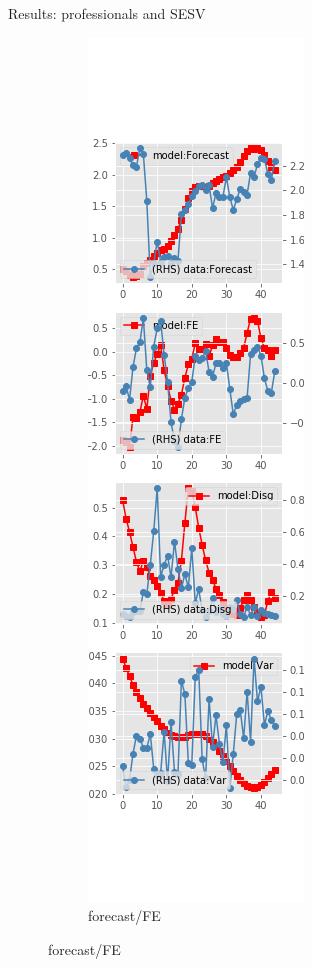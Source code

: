 \documentclass{beamer}
\begin{document}
\begin{frame}{Results: professionals and SESV}
\begin{figure}[ht]
\begin{subfigure}[b]{0.19\textwidth}
		\end{subfigure}
		\hfill
		\begin{subfigure}[b]{0.19\textwidth}
			\caption{forecast/FE}
			\includegraphics[width=\textwidth, height = 0.8\textheight]{figuresDraft/spf_se_est_sv_diag2.png}

\end{subfigure}
\end{figure}
\end{frame}
\end{document}
